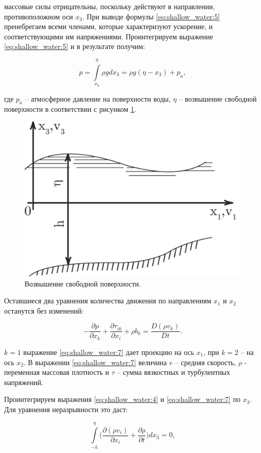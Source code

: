 \documentclass[14pt]{extreport}
\begin{document}
 массовые силы отрицательны, поскольку действуют в направлении, противоположном оси $x_3$. При выводе формулы \eqref{eq:shallow_water:5} пренебрегаем всеми членами, которые характеризуют ускорение, и соответствующими им напряжениями. Проинтегрируем выражение \eqref{eq:shallow_water:5} и в результате получим:

\begin{equation}\label{eq:shallow_water:6}
p = \int\limits^\eta_{x_3} \rho g dx_3 = \rho g (\eta-x_3)+p_a,
\end{equation}

\noindent где $p_a$ -- атмосферное давление на поверхности воды,
$\eta$ -- возвышение свободной поверхности в соответствии с рисунком \ref{img:shallow_water:1}.

\begin{figure}[H]
\centerline{\includegraphics[width=0.5\linewidth]{images/shallow_water_1}}
\caption{Возвышение свободной поверхности.}
\label{img:shallow_water:1}
\end{figure}

Оставшиеся два уравнения количества движения по направлениям $x_1$ и $x_2$ останутся без изменений:

\begin{equation}\label{eq:shallow_water:7}
-\frac{\partial p}{\partial x_k} + \frac{\partial \tau_{ik}}{\partial x_i} + \rho b_k = \frac{D(\rho v_k)}{Dt}.
\end{equation}

 $k=1$ выражение \eqref{eq:shallow_water:7} дает проекцию на ось $x_1$, при $k=2$ -- на ось $x_2$. В выражении \eqref{eq:shallow_water:7} величина $v$ -- средняя скорость, $\rho$ - переменная массовая плотность и $\tau$ -- сумма вязкостных и турбулентных напряжений.

Проинтегрируем выражения \eqref{eq:shallow_water:4} и \eqref{eq:shallow_water:7} по $x_3$. Для уравнения неразрывности это даст:

\begin{equation}\label{eq:shallow_water:8}
\int\limits^\eta_{-h} \bigg(\frac{\partial (\rho v_i)}{\partial x_i} + \frac{\partial \rho}{\partial t}\bigg) dx_3 =0,
\end{equation}
\end{document}
